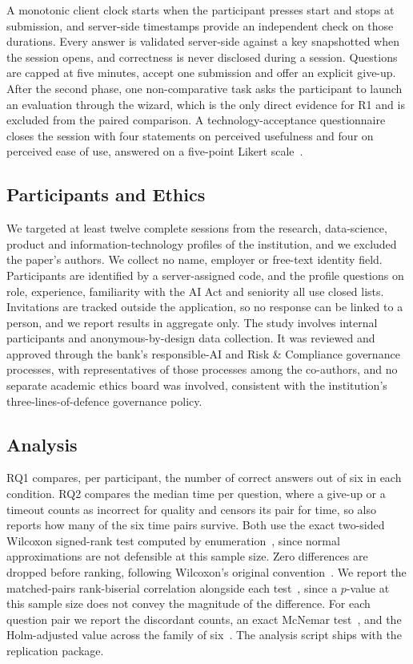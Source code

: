 \documentclass[10pt,conference]{IEEEtran}
\begin{document}
A monotonic client clock starts when the participant presses start and stops at submission, and server-side timestamps provide an independent check on those durations.
Every answer is validated server-side against a key snapshotted when the session opens, and correctness is never disclosed during a session.
Questions are capped at five minutes, accept one submission and offer an explicit give-up.
After the second phase, one non-comparative task asks the participant to launch an evaluation through the wizard, which is the only direct evidence for R1 and is excluded from the paired comparison.
A technology-acceptance questionnaire closes the session with four statements on perceived usefulness and four on perceived ease of use, answered on a five-point Likert scale~\cite{davis1989tam}.

\subsection{Participants and Ethics}
We targeted at least twelve complete sessions from the research, data-science, product and information-technology profiles of the institution, and we excluded the paper's authors.
We collect no name, employer or free-text identity field.
Participants are identified by a server-assigned code, and the profile questions on role, experience, familiarity with the AI Act and seniority all use closed lists.
Invitations are tracked outside the application, so no response can be linked to a person, and we report results in aggregate only.
The study involves internal participants and anonymous-by-design data collection.
It was reviewed and approved through the bank's responsible-AI and Risk \& Compliance governance processes, with representatives of those processes among the co-authors, and no separate academic ethics board was involved, consistent with the institution's three-lines-of-defence governance policy.

\subsection{Analysis}
RQ1 compares, per participant, the number of correct answers out of six in each condition.
RQ2 compares the median time per question, where a give-up or a timeout counts as incorrect for quality and censors its pair for time, so  also reports how many of the six time pairs survive.
Both use the exact two-sided Wilcoxon signed-rank test computed by enumeration~\cite{wilcoxon1945}, since normal approximations are not defensible at this sample size.
Zero differences are dropped before ranking, following Wilcoxon's original convention~\cite{wilcoxon1945}.
We report the matched-pairs rank-biserial correlation alongside each test~\cite{kerby2014}, since a $p$-value at this sample size does not convey the magnitude of the difference.
For each question pair we report the discordant counts, an exact McNemar test~\cite{mcnemar1947}, and the Holm-adjusted value across the family of six~\cite{holm1979}.
The analysis script ships with the replication package.
\end{document}
